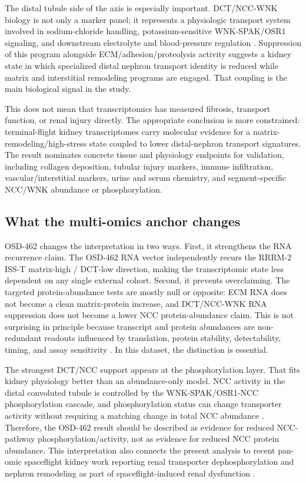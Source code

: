 \documentclass[11pt]{article}
\begin{document}
The distal tubule side of the axis is especially important. DCT/NCC-WNK biology is not only a marker panel; it represents a physiologic transport system involved in sodium-chloride handling, potassium-sensitive WNK-SPAK/OSR1 signaling, and downstream electrolyte and blood-pressure regulation \citep{castaneda2024dct,ge2016wnk}. Suppression of this program alongside ECM/adhesion/proteolysis activity suggests a kidney state in which specialized distal nephron transport identity is reduced while matrix and interstitial remodeling programs are engaged. That coupling is the main biological signal in the study.

This does not mean that transcriptomics has measured fibrosis, transport function, or renal injury directly. The appropriate conclusion is more constrained: terminal-flight kidney transcriptomes carry molecular evidence for a matrix-remodeling/high-stress state coupled to lower distal-nephron transport signatures. The result nominates concrete tissue and physiology endpoints for validation, including collagen deposition, tubular injury markers, immune infiltration, vascular/interstitial markers, urine and serum chemistry, and segment-specific NCC/WNK abundance or phosphorylation.

\subsection{What the multi-omics anchor changes}

OSD-462 changes the interpretation in two ways. First, it strengthens the RNA recurrence claim. The OSD-462 RNA vector independently recurs the RRRM-2 ISS-T matrix-high / DCT-low direction, making the transcriptomic state less dependent on any single external cohort. Second, it prevents overclaiming. The targeted protein-abundance tests are mostly null or opposite: ECM RNA does not become a clean matrix-protein increase, and DCT/NCC-WNK RNA suppression does not become a lower NCC protein-abundance claim. This is not surprising in principle because transcript and protein abundances are non-redundant readouts influenced by translation, protein stability, detectability, timing, and assay sensitivity \citep{liu2020mrnaprotein}. In this dataset, the distinction is essential.

The strongest DCT/NCC support appears at the phosphorylation layer. That fits kidney physiology better than an abundance-only model. NCC activity in the distal convoluted tubule is controlled by the WNK-SPAK/OSR1-NCC phosphorylation cascade, and phosphorylation status can change transporter activity without requiring a matching change in total NCC abundance \citep{ge2016wnk,wnk2020,wnk2022}. Therefore, the OSD-462 result should be described as evidence for reduced NCC-pathway phosphorylation/activity, not as evidence for reduced NCC protein abundance. This interpretation also connects the present analysis to recent pan-omic spaceflight kidney work reporting renal transporter dephosphorylation and nephron remodeling as part of spaceflight-induced renal dysfunction \citep{siew2024cosmic}.
\end{document}
